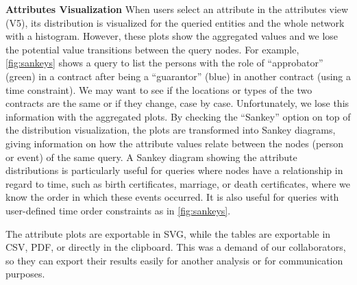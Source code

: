 \noindent\textbf{Attributes Visualization} When users select an attribute in the attributes view (V5), its distribution is visualized for the queried entities and the whole network with a histogram.
However, these plots show the aggregated values and we lose the potential value transitions between the query nodes.
For example, \autoref{fig:sankeys} shows a query to list the persons with the role of ``approbator'' (green) in a contract after being a ``guarantor'' (blue) in another contract (using a time constraint).
We may want to see if the locations or types of the two contracts are the same or if they change, case by case.
Unfortunately, we lose this information with the aggregated plots.
By checking the ``Sankey'' option on top of the distribution visualization, the plots are transformed into Sankey diagrams, giving information on how the attribute values relate between the nodes (person or event) of the same query.
A Sankey diagram showing the attribute distributions is particularly useful for queries where nodes have a relationship in regard to time, such as birth certificates, marriage, or death certificates, where we know the order in which these events occurred.
It is also useful for queries with user-defined time order constraints as in \autoref{fig:sankeys}.

The attribute plots are exportable in SVG, while the tables are exportable in CSV, PDF, or directly in the clipboard.
This was a demand of our collaborators, so they can export their results easily for another analysis or for communication purposes.

